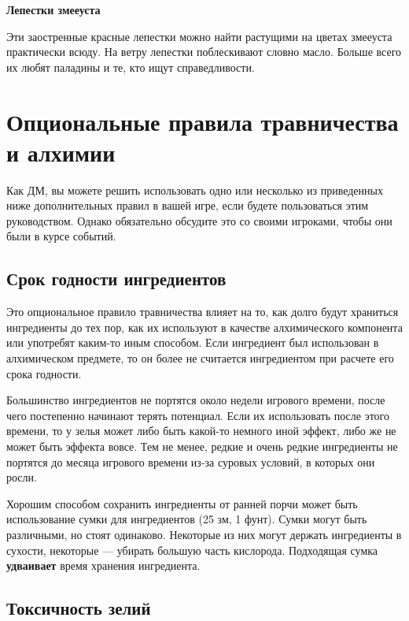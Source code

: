 \documentclass[a4paper, 9pt, twocolumn]{book}
\begin{document}
	\medspace
	
	\noindent \textbf{Лепестки змееуста}
	
	\smallskip
	
	\noindent Эти заостренные красные лепестки можно найти растущими на цветах змееуста практически всюду. На ветру лепестки поблескивают словно масло. Больше всего их любят паладины и те, кто ищут справедливости.
	
	
	\chapter{Опциональные правила травничества и алхимии}
	
	Как ДМ, вы можете решить использовать одно или несколько из приведенных ниже дополнительных правил в вашей игре, если будете пользоваться этим руководством. Однако обязательно обсудите это со своими игроками, чтобы они были в курсе событий.
	
	\section{Срок годности ингредиентов}
	
	Это опциональное правило травничества влияет на то, как долго будут храниться ингредиенты до тех пор, как их используют в качестве алхимического компонента или употребят каким-то иным способом. Если ингредиент был использован в алхимическом предмете, то он более не считается ингредиентом при расчете его срока годности.
	
	Большинство ингредиентов не портятся около недели игрового времени, после чего постепенно начинают терять потенциал. Если их использовать после этого времени, то у зелья может либо быть какой-то немного иной эффект, либо же не может быть эффекта вовсе. Тем не менее, редкие и очень редкие ингредиенты не портятся до месяца игрового времени из-за суровых условий, в которых они росли.
	
	Хорошим способом сохранить ингредиенты от ранней порчи может быть использование сумки для ингредиентов (25 зм, 1 фунт). Сумки могут быть различными, но стоят одинаково. Некоторые из них могут держать ингредиенты в сухости, некоторые --- убирать большую часть кислорода. Подходящая сумка \textbf{удваивает} время хранения ингредиента.
	
	\section{Токсичность зелий}
	
\end{document}
